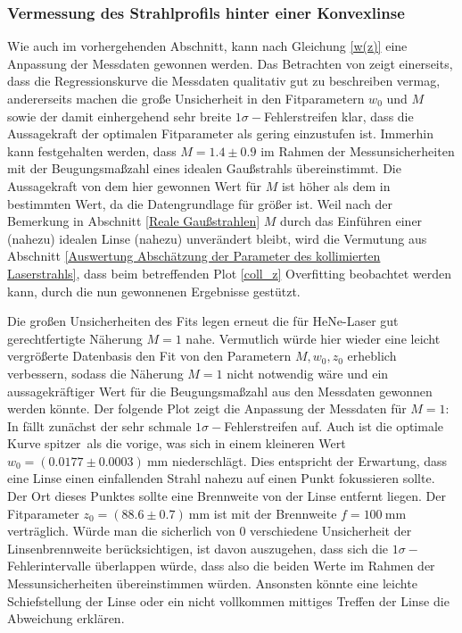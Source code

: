 \documentclass[11pt,a4paper,oneside]{scrartcl}
\begin{document}
\subsubsection{Vermessung des Strahlprofils hinter einer Konvexlinse}\label{Auswertung Vermessung des Strahlprofils hinter einer Konvexlinse}
Wie auch im vorhergehenden Abschnitt, kann nach Gleichung \ref{w(z)} eine Anpassung der Messdaten gewonnen werden. 
Das Betrachten von  zeigt einerseits, dass die Regressionskurve die Messdaten qualitativ gut zu beschreiben vermag, andererseits machen die große Unsicherheit in den Fitparametern $w_0$ und $M$ sowie der damit einhergehend sehr breite $1\sigma-$Fehlerstreifen klar, dass die Aussagekraft der optimalen Fitparameter als gering einzustufen ist. Immerhin kann festgehalten werden, dass $M=1.4\pm0.9$ im Rahmen der Messunsicherheiten mit der Beugungsmaßzahl eines idealen Gaußstrahls übereinstimmt. Die Aussagekraft von dem hier gewonnen Wert für $M$ ist höher als dem in  bestimmten Wert, da die Datengrundlage für  größer ist. Weil nach der Bemerkung in Abschnitt \ref{Reale Gaußstrahlen} $M$ durch das Einführen einer (nahezu) idealen Linse (nahezu) unverändert bleibt, wird die Vermutung aus Abschnitt \ref{Auswertung Abschätzung der Parameter des kollimierten Laserstrahls}, dass beim betreffenden Plot \ref{coll_z} Overfitting beobachtet werden kann, durch die nun gewonnenen Ergebnisse gestützt.\par
Die großen Unsicherheiten des Fits legen erneut die für HeNe-Laser gut gerechtfertigte Näherung $M=1$ nahe. Vermutlich würde hier wieder eine leicht vergrößerte Datenbasis den Fit von den Parametern $M,w_0,z_0$ erheblich verbessern, sodass die Näherung $M=1$ nicht notwendig wäre und ein aussagekräftiger Wert für die Beugungsmaßzahl aus den Messdaten gewonnen werden könnte. Der folgende Plot zeigt die Anpassung der Messdaten für $M=1$:
In  fällt zunächst der sehr schmale $1\sigma-$Fehlerstreifen auf. Auch ist die optimale Kurve \glqq spitzer\grqq\ als die vorige, was sich in einem kleineren Wert $w_0=(0.0177\pm0.0003)\ \mathrm{mm}$ niederschlägt. Dies entspricht der Erwartung, dass eine Linse einen einfallenden Strahl nahezu auf einen Punkt fokussieren sollte. Der Ort dieses Punktes sollte eine Brennweite von der Linse entfernt liegen. Der Fitparameter $z_0=(88.6\pm0.7)\ \mathrm{mm}$ ist mit der Brennweite $f=100\ \mathrm{mm}$ verträglich. Würde man die sicherlich von $0$ verschiedene Unsicherheit der Linsenbrennweite berücksichtigen, ist davon auszugehen, dass sich die $1\sigma-$Fehlerintervalle überlappen würde, dass also die beiden Werte im Rahmen der Messunsicherheiten übereinstimmen würden. Ansonsten könnte eine leichte Schiefstellung der Linse oder ein nicht vollkommen mittiges Treffen der Linse die Abweichung erklären. \\
\end{document}
